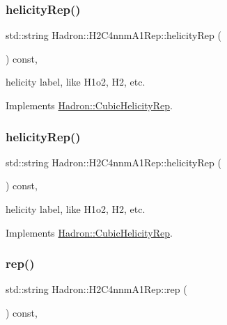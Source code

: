 \subsubsection{\texorpdfstring{helicityRep()}{helicityRep()}\hspace{0.1cm}{\footnotesize\ttfamily [2/3]}}
{\footnotesize\ttfamily std\+::string Hadron\+::\+H2\+C4nnm\+A1\+Rep\+::helicity\+Rep (\begin{DoxyParamCaption}{ }\end{DoxyParamCaption}) const\hspace{0.3cm}{\ttfamily [inline]}, {\ttfamily [virtual]}}

helicity label, like H1o2, H2, etc. 

Implements \mbox{\hyperlink{structHadron_1_1CubicHelicityRep_af1096946b7470edf0a55451cc662f231}{Hadron\+::\+Cubic\+Helicity\+Rep}}.

\mbox{\label{structHadron_1_1H2C4nnmA1Rep_a383c3c921c06e12e6ad53f2acb09bda1}} 
\subsubsection{\texorpdfstring{helicityRep()}{helicityRep()}\hspace{0.1cm}{\footnotesize\ttfamily [3/3]}}
{\footnotesize\ttfamily std\+::string Hadron\+::\+H2\+C4nnm\+A1\+Rep\+::helicity\+Rep (\begin{DoxyParamCaption}{ }\end{DoxyParamCaption}) const\hspace{0.3cm}{\ttfamily [inline]}, {\ttfamily [virtual]}}

helicity label, like H1o2, H2, etc. 

Implements \mbox{\hyperlink{structHadron_1_1CubicHelicityRep_af1096946b7470edf0a55451cc662f231}{Hadron\+::\+Cubic\+Helicity\+Rep}}.

\mbox{\label{structHadron_1_1H2C4nnmA1Rep_ab84ffb9381f49b933c6c3fdf5936fa92}} 
\subsubsection{\texorpdfstring{rep()}{rep()}\hspace{0.1cm}{\footnotesize\ttfamily [1/5]}}
{\footnotesize\ttfamily std\+::string Hadron\+::\+H2\+C4nnm\+A1\+Rep\+::rep (\begin{DoxyParamCaption}{ }\end{DoxyParamCaption}) const\hspace{0.3cm}{\ttfamily [inline]}, {\ttfamily [virtual]}}



